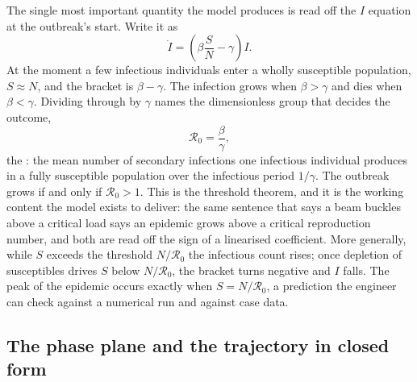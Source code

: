The single most important quantity the model produces is read off the
$I$ equation at the outbreak's start. Write it as
\[
\dot{I} = \left(\beta \frac{S}{N} - \gamma\right) I.
\]
At the moment a few infectious individuals enter a wholly susceptible
population, $S \approx N$, and the bracket is $\beta - \gamma$. The
infection grows when $\beta > \gamma$ and dies when $\beta < \gamma$.
Dividing through by $\gamma$ names the dimensionless group that decides
the outcome,
\[
\mathcal{R}_{0} = \frac{\beta}{\gamma},
\]
the : the mean number of secondary
infections one infectious individual produces in a fully susceptible
population over the infectious period $1/\gamma$. The outbreak grows
if and only if $\mathcal{R}_{0} > 1$. This is the threshold theorem,
and it is the working content the model exists to deliver: the same
sentence that says a beam buckles above a critical load says an
epidemic grows above a critical reproduction number, and both are read
off the sign of a linearised coefficient. More generally, while $S$
exceeds the threshold $N/\mathcal{R}_{0}$ the infectious count rises;
once depletion of susceptibles drives $S$ below $N/\mathcal{R}_{0}$,
the bracket turns negative and $I$ falls. The peak of the epidemic
occurs exactly when $S = N/\mathcal{R}_{0}$, a prediction the engineer
can check against a numerical run and against case data.

\subsection{The phase plane and the trajectory in closed form}

